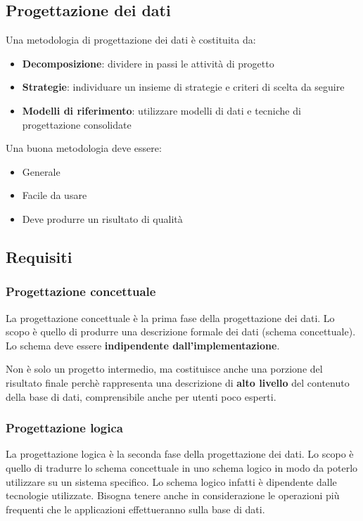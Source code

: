 \documentclass[a4paper]{article}
\begin{document}
\subsection{Progettazione dei dati}
Una metodologia di progettazione dei dati è costituita da:
\begin{itemize}
  \item \textbf{Decomposizione}: dividere in passi le attività di progetto
  \item \textbf{Strategie}: individuare un insieme di strategie e criteri di scelta da
    seguire
  \item \textbf{Modelli di riferimento}: utilizzare modelli di dati e tecniche di
    progettazione consolidate
\end{itemize}
Una buona metodologia deve essere:
\begin{itemize}
  \item Generale
  \item Facile da usare
  \item Deve produrre un risultato di qualità
\end{itemize}

\subsection{Requisiti}
\subsubsection{Progettazione concettuale}
La progettazione concettuale è la prima fase della progettazione dei dati. Lo scopo è
quello di produrre una descrizione formale dei dati (schema concettuale). Lo schema
deve essere \textbf{indipendente dall'implementazione}.

\vspace{1em}
\noindent
Non è solo un progetto intermedio, ma costituisce anche una porzione del risultato finale
perchè rappresenta una descrizione di \textbf{alto livello} del contenuto della base di
dati, comprensibile anche per utenti poco esperti.

\subsubsection{Progettazione logica}
La progettazione logica è la seconda fase della progettazione dei dati. Lo scopo è
quello di tradurre lo schema concettuale in uno schema logico in modo da poterlo
utilizzare su un sistema specifico. Lo schema logico infatti è dipendente dalle
tecnologie utilizzate. Bisogna tenere anche in considerazione le operazioni più
frequenti che le applicazioni effettueranno sulla base di dati.
\end{document}
